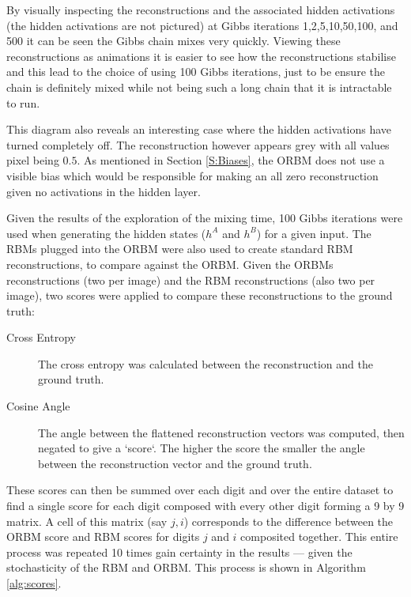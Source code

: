   By visually inspecting the reconstructions and the associated hidden activations (the hidden activations are not pictured) at Gibbs iterations 1,2,5,10,50,100, and 500 it can be seen the Gibbs chain mixes very quickly. Viewing these reconstructions as animations it is easier to see how the reconstructions stabilise and this lead to the choice of using 100 Gibbs iterations, just to be ensure the chain is definitely mixed while not being such a long chain that it is intractable to run.

  This diagram also reveals an interesting case where the hidden activations have turned completely off. The reconstruction however appears grey with all values pixel being $0.5$. As mentioned in Section \ref{S:Biases}, the ORBM does not use a visible bias which would be responsible for making an all zero reconstruction given no activations in the hidden layer.


  Given the results of the exploration of the mixing time, 100 Gibbs iterations were used when generating the hidden states ($h^A$ and $h^B$) for a given input. The RBMs plugged into the ORBM were also used to create standard RBM reconstructions, to compare against the ORBM. Given the ORBMs reconstructions (two per image) and the RBM reconstructions (also two per image), two scores were applied to compare these reconstructions to the ground truth:
  \begin{description}
    \item[Cross Entropy] The cross entropy was calculated between the reconstruction and the ground truth.
    \item[Cosine Angle] The angle between the flattened reconstruction vectors was computed, then negated to give a `score`. The higher the score the smaller the angle between the reconstruction vector and the ground truth.
  \end{description}
  These scores can then be summed over each digit and over the entire dataset to find a single score for each digit composed with every other digit forming a 9 by 9 matrix. A cell of this matrix (say $j,i$) corresponds to the difference between the ORBM score and RBM scores for digits $j$ and $i$ composited together. This entire process was repeated 10 times gain certainty in the results --- given the stochasticity of the RBM and ORBM. This process is shown in Algorithm \ref{alg:scores}.

